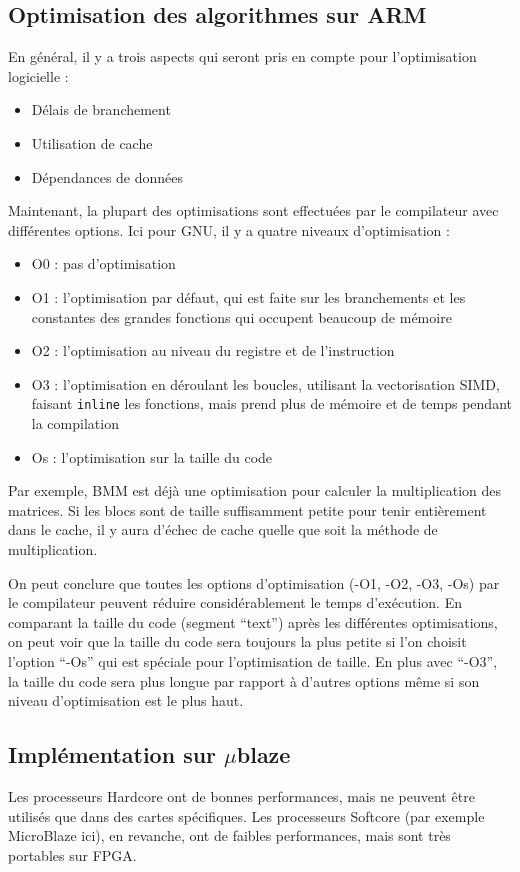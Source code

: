 \documentclass[12pt,a4paper]{ieee}
\begin{document}
\subsection{Optimisation des algorithmes sur ARM}
En général, il y a trois aspects qui seront pris en compte pour l’optimisation logicielle :
\begin{itemize}
\item Délais de branchement
\item Utilisation de cache
\item Dépendances de données
\end{itemize}
Maintenant, la plupart des optimisations sont effectuées par le compilateur avec différentes options. Ici pour GNU, il y a quatre niveaux d’optimisation :
\begin{itemize}
\item O0 : pas d’optimisation
\item O1 : l’optimisation par défaut, qui est faite sur les branchements et les constantes des grandes fonctions qui occupent beaucoup de mémoire
\item  O2 : l’optimisation au niveau du registre et de l’instruction 
\item O3 : l’optimisation en déroulant les boucles, utilisant la vectorisation SIMD, faisant \texttt{inline} les fonctions, mais prend plus de mémoire et de temps pendant la compilation
\item Os : l’optimisation sur la taille du code
\end{itemize}

Par exemple, BMM est déjà une optimisation pour calculer la multiplication des matrices. Si les blocs sont de taille suffisamment petite pour tenir entièrement dans le cache, il y aura d’échec de cache quelle que soit la méthode de multiplication.

On peut conclure que toutes les options d'optimisation (-O1, -O2, -O3, -Os) par le compilateur peuvent réduire considérablement le temps d'exécution. En comparant la taille du code (segment “text”) après les différentes optimisations, on peut voir que la taille du code sera toujours la plus petite si l’on choisit l’option “-Os” qui est spéciale pour l’optimisation de taille. En plus avec “-O3”, la taille du code sera plus longue par rapport à d'autres options même si son niveau d’optimisation est le plus haut.

\subsection{Implémentation sur $\mu$blaze}
Les processeurs Hardcore ont de bonnes performances, mais ne peuvent être utilisés que dans des cartes spécifiques. Les processeurs Softcore (par exemple MicroBlaze ici), en revanche, ont de faibles performances, mais sont très portables sur FPGA.
\end{document}
